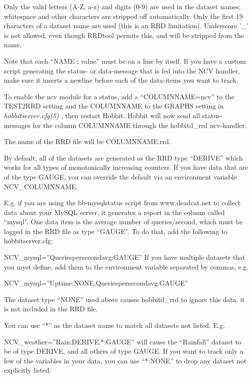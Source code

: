   Only the valid letters (A-Z, a-z) and digits (0-9) are used in the dataset names; whitespace and other characters are stripped off automatically. Only the first 19 characters of a dataset name are used (this is an RRD limitation). Underscore '\_' is not allowed, even though RRDtool permits this, and will be stripped from the name. 


  Note that each ``NAME : value'' must be on a line by itself. If you have a custom script generating the status- or data-message that is fed into the NCV handler, make sure it inserts a newline before each of the data-items you want to track. 


  To enable the ncv module for a status, add a ``COLUMNNAME=ncv'' to the TEST2RRD setting and the COLUMNNAME to the GRAPHS setting in \emph{hobbitserver.cfg(5)}
 , then restart Hobbit. Hobbit will now send all status-messages for the column COLUMNNAME through the hobbitd\_rrd ncv-handler. 


  The name of the RRD file will be COLUMNNAME.rrd. 


  By default, all of the datasets are generated as the RRD type ``DERIVE'' which works for all types of monotonically increasing counters. If you have data that are of the type GAUGE, you can override the default via an environment variable NCV\_COLUMNNAME. 


  E.g. if you are using the bb-mysqlstatus script from www.deadcat.net to collect data about your MySQL server, it generates a report in the column called ``mysql''. One data item is the average number of queries/second, which must be logged in the RRD file as type ``GAUGE''. To do that, add the following to hobbitserver.cfg:  
 
NCV\_mysql=''Queriespersecondavg:GAUGE''  
 If you have multiple datasets that you myst define, add them to the environment variable separated by commas, e.g.  
 
NCV\_mysql=''Uptime:NONE,Queriespersecondavg:GAUGE''  



  The dataset type ``NONE'' used above causes hobbitd\_rrd to ignore this data, it is not included in the RRD file. 


  You can use ``*'' as the dataset name to match all datasets not listed. E.g.  
 
NCV\_weather=''Rain:DERIVE,*:GAUGE''  
 will cause the ``Rainfall'' dataset to be of type DERIVE, and all others of type GAUGE. If you want to track only a few of the variables in your data, you can use ``*:NONE'' to drop any dataset not explicitly listed. 


